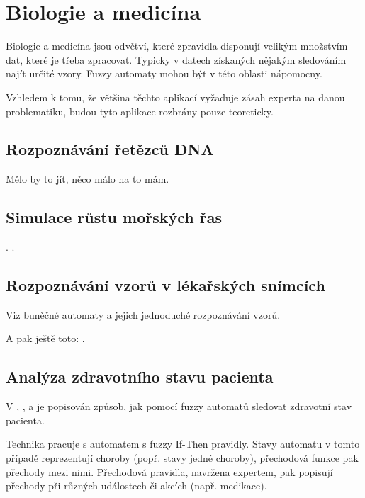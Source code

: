 \documentclass[a4paper,10pt]{article}
\begin{document}
\section{Biologie a medicína}

Biologie a medicína jsou odvětví, které zpravidla disponují velikým množstvím dat, které je třeba zpracovat. Typicky v datech získaných nějakým sledováním najít určité vzory. Fuzzy automaty mohou být v této oblasti nápomocny.

Vzhledem k tomu, že většina těchto aplikací vyžaduje zásah experta na danou problematiku, budou tyto aplikace rozbrány pouze teoreticky.


\subsection{Rozpoznávání řetězců DNA}


Mělo by to jít, něco málo na to mám. \cite{SnaKepAbrHas-AproxStriMatchFuzzAut}



\subsection{Simulace růstu mořských řas}

\cite{CheMyn-ModAlgBloDutCosWat+}. .

\subsection{Rozpoznávání vzorů v lékařských snímcích}
Viz buněčné automaty a jejich jednoduché rozpoznávání vzorů.

A pak ještě toto: \cite{PatPal-FuzGraSynRecSkeMatXra}.

\subsection{Analýza zdravotního stavu pacienta}
V \cite{Jia+-ExHeaSimMetBasIntHumTheMod}, \cite{GupRah-CliMonUsFuzSys}, \cite{CamMerNun-UsFuzAutDiagPrHeaPro} a \cite{SteAdl-CliMonFuzAut} je popisován způsob, jak pomocí fuzzy automatů sledovat zdravotní stav pacienta. 


Technika pracuje s automatem s fuzzy If-Then pravidly. Stavy automatu v tomto případě reprezentují choroby (popř. stavy jedné choroby), přechodová funkce pak přechody mezi nimi. Přechodová pravidla, navržena expertem, pak popisují přechody při různých událostech či akcích (např. medikace). 
\end{document}
